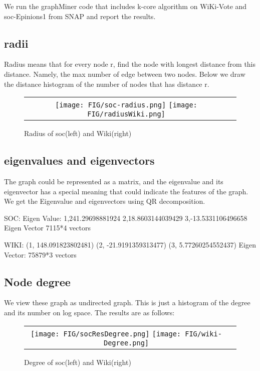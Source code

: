 We run the graphMiner code that includes k-core algorithm on WiKi-Vote and soc-Epinions1 from SNAP and report the results.

\subsection{radii}
Radius means that for every node r, find the node with longest distance from this distance. 
Namely, the max number of edge between two nodes.
Below we draw the distance histogram of the number of nodes that has distance r.

\begin{figure}[H]
\begin{center}
\begin{tabular}{cc}
     \texttt{[image: FIG/soc-radius.png]} 
     \texttt{[image: FIG/radiusWiki.png]} 
\end{tabular}
\caption{Radius of soc(left) and Wiki(right)}
\label{fig:results}
\end{center}
\end{figure}

\subsection{eigenvalues and eigenvectors}

The graph could be represented as a matrix, and the eigenvalue and its eigenvector has a special meaning that could indicate the features of the graph. We get the Eigenvalue and eigenvectors using QR decomposition.

SOC:
Eigen Value:
	1,241.29698881924
	2,18.8603144039429
	3,-13.5331106496658
Eigen Vector
	7115*4 vectors

WIKI:
	(1, 148.091823802481)
	(2, -21.9191359313477)
	(3, 5.77260254552437)
Eigen Vector:
	75879*3 vectors


\subsection{Node degree}

We view these graph as undirected graph. This is just a histogram of the degree and its number on log space. The results are as follows:

\begin{figure}[H]
\begin{center}
\begin{tabular}{cc}
     \texttt{[image: FIG/socResDegree.png]} 
     \texttt{[image: FIG/wiki-Degree.png]} 
\end{tabular}
\caption{Degree of soc(left) and Wiki(right)}
\label{fig:results}
\end{center}
\end{figure}

